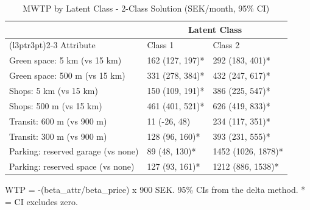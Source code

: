 \begin{table}[!h]
\centering
\caption{MWTP by Latent Class - 2-Class Solution (SEK/month, 95\% CI)}
\centering
\begin{threeparttable}
\begin{tabular}[t]{lll}
\toprule
\multicolumn{1}{c}{ } & \multicolumn{2}{c}{Latent Class} \\
\cmidrule(l{3pt}r{3pt}){2-3}
Attribute & Class 1 & Class 2\\
\midrule
Green space: 5 km (vs 15 km) & 162 (127, 197)* & 292 (183, 401)*\\
Green space: 500 m (vs 15 km) & 331 (278, 384)* & 432 (247, 617)*\\
Shops: 5 km (vs 15 km) & 150 (109, 191)* & 386 (225, 547)*\\
Shops: 500 m (vs 15 km) & 461 (401, 521)* & 626 (419, 833)*\\
Transit: 600 m (vs 900 m) & 11 (-26, 48) & 234 (117, 351)*\\
\addlinespace
Transit: 300 m (vs 900 m) & 128 (96, 160)* & 393 (231, 555)*\\
Parking: reserved garage (vs none) & 89 (48, 130)* & 1452 (1026, 1878)*\\
Parking: reserved space (vs none) & 127 (93, 161)* & 1212 (886, 1538)*\\
\bottomrule
\end{tabular}
\begin{tablenotes}
\item WTP = -(beta\_attr/beta\_price) x 900 SEK. 95\% CIs from the delta method. * = CI excludes zero.
\end{tablenotes}
\end{threeparttable}
\end{table}
